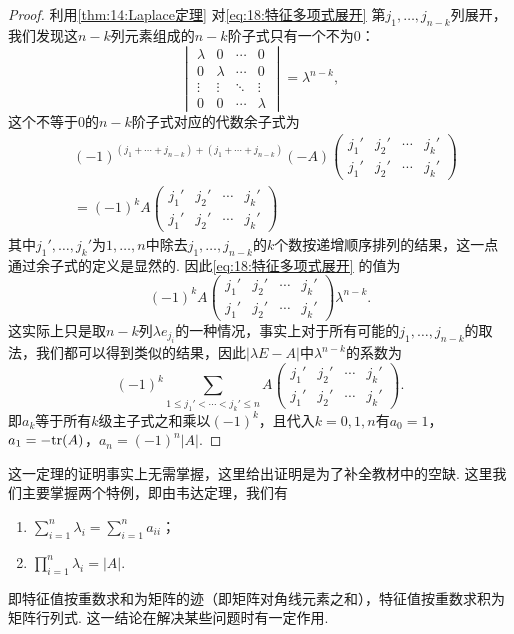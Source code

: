 \begin{proof}
    利用\autoref{thm:14:Laplace定理} 对\autoref{eq:18:特征多项式展开} 第$j_1,\ldots,j_{n-k}$列展开，我们发现这$n-k$列元素组成的$n-k$阶子式只有一个不为0：
    \[\begin{vmatrix}
            \lambda & 0       & \cdots & 0       \\
            0       & \lambda & \cdots & 0       \\
            \vdots  & \vdots  & \ddots & \vdots  \\
            0       & 0       & \cdots & \lambda
        \end{vmatrix}=\lambda^{n-k},\]
    这个不等于0的$n-k$阶子式对应的代数余子式为
    \begin{align*}
         & (-1)^{(j_1+\cdots+j_{n-k})+(j_1+\cdots+j_{n-k})}(-A)
        \begin{pmatrix}
            j_1' & j_2' & \cdots & j_k' \\
            j_1' & j_2' & \cdots & j_k'
        \end{pmatrix}                             \\
         & = (-1)^kA\begin{pmatrix}
                        j_1' & j_2' & \cdots & j_k' \\
                        j_1' & j_2' & \cdots & j_k'
                    \end{pmatrix}
    \end{align*}
    其中$j_1',\ldots,j_k'$为$1,\ldots,n$中除去$j_1,\ldots,j_{n-k}$的$k$个数按递增顺序排列的结果，这一点通过余子式的定义是显然的. 因此\autoref{eq:18:特征多项式展开} 的值为
    \[(-1)^kA\begin{pmatrix}
            j_1' & j_2' & \cdots & j_k' \\
            j_1' & j_2' & \cdots & j_k'
        \end{pmatrix}\lambda^{n-k}.\]
    这实际上只是取$n-k$列$\lambda e_{j_i}$的一种情况，事实上对于所有可能的$j_1,\ldots,j_{n-k}$的取法，我们都可以得到类似的结果，因此$|\lambda E-A|$中$\lambda^{n-k}$的系数为
    \[(-1)^k\sum\limits_{1\leqslant j_1'<\cdots<j_k'\leqslant n}A\begin{pmatrix}
            j_1' & j_2' & \cdots & j_k' \\
            j_1' & j_2' & \cdots & j_k'
        \end{pmatrix}.\]
    即$a_k$等于所有$k$级主子式之和乘以$(-1)^k$，且代入$k=0,1,n$有$a_0=1$，$a_1=-\textup{tr}(A)$，$a_n=(-1)^n|A|$.
\end{proof}

这一定理的证明事实上无需掌握，这里给出证明是为了补全教材中的空缺. 这里我们主要掌握两个特例，即由韦达定理，我们有
\begin{enumerate}
    \item $\displaystyle\sum_{i=1}^{n}\lambda_i=\displaystyle\sum_{i=1}^{n}a_{ii}$；

    \item $\displaystyle\prod_{i=1}^{n}\lambda_i=|A|$.
\end{enumerate}
即特征值按重数求和为矩阵的迹（即矩阵对角线元素之和），特征值按重数求积为矩阵行列式. 这一结论在解决某些问题时有一定作用.

